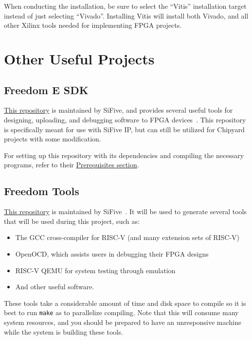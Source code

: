 When conducting the installation, be sure to select the ``Vitis'' installation target instead of just selecting ``Vivado''.
Installing Vitis will install both Vivado, and all other Xilinx tools needed for implementing FPGA projects.

\section{Other Useful Projects}\label{sec:Other_Useful_Projects}
\subsection{Freedom E SDK}\label{sec:Freedom_E_SDK}
\href{https://github.com/sifive/freedom-e-sdk}{This repository} is maintained by SiFive, and provides several useful tools for designing, uploading, and debugging software to FPGA devices~\cite{freedomESDK}.
This repository is specifically meant for use with SiFive IP, but can still be utilized for Chipyard projects with some modification.

For setting up this repository with its dependencies and compiling the necessary programs, refer to their \href{https://github.com/sifive/freedom-e-sdk#setting-up-the-sdk}{Prerequisites section}.

\subsection{Freedom Tools}\label{sec:Freedom_Tools}
\href{https://github.com/sifive/freedom-tools}{This repository} is maintained by SiFive~\cite{freedomTools}.
It will be used to generate several tools that will be used during this project, such as:
\begin{itemize}
\item The GCC cross-compiler for RISC-V (and many extension sets of RISC-V)
\item OpenOCD, which assists users in debugging their FPGA designs
\item RISC-V QEMU for system testing through emulation
\item And other useful software.
\end{itemize}

These tools take a considerable amount of time and disk space to compile so it is best to run \texttt{make} as  to parallelize compiling.
Note that this will consume many system resources, and you should be prepared to have an unresponsive machine while the system is building these tools.

